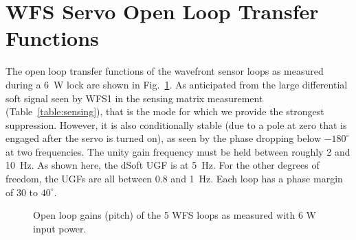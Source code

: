 \section{WFS Servo Open Loop Transfer Functions}
\label{sec:WFSolgs}
The open loop transfer functions of the wavefront sensor loops as
measured during a 6~W lock are shown in Fig.~\ref{fig:olgs6W}. As
anticipated from the large differential soft signal seen by WFS1 in
the sensing matrix measurement (Table~\ref{table:sensing}), that is
the mode for which we provide the strongest suppression. However, it
is also conditionally stable (due to a pole at zero that is engaged
after the servo is turned on), as seen by the phase dropping below
$-180^{\circ}$ at two frequencies. The unity gain frequency must be
held between roughly 2 and 10~Hz. As shown here, the dSoft UGF is at
5~Hz. For the other degrees of freedom, the UGFs are all between 0.8
and 1~Hz. Each loop has a phase margin of 30 to $40^{\circ}$.

\begin{figure}
\begin{centering}
\caption{Open loop gains (pitch) of the 5 WFS loops as measured with 6 W
  input power.}
\label{fig:olgs6W}
\end{centering}
\end{figure}



